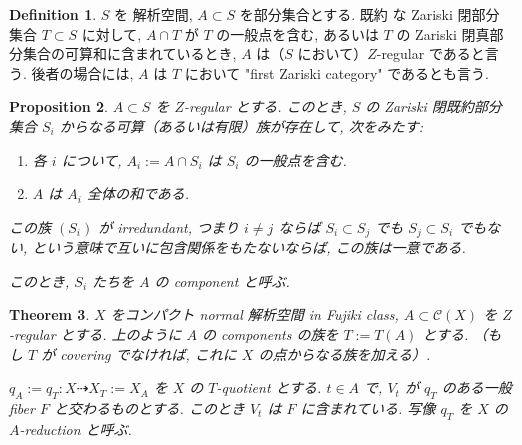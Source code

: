 \documentclass[dvipdfmx,a4paper,11pt]{article} %
\newtheorem{thm}{Theorem}[section]
\newtheorem{prop}[thm]{Proposition}
\theoremstyle{definition}
\newtheorem{defn}[thm]{Definition}
\theoremstyle{remark}
\numberwithin{equation}{section}
\begin{document}
\begin{defn}\cite[Definition 2.1]{Cam04a}
\(S\) を 解析空間,  \(A \subset S\) を部分集合とする. 
既約 な Zariski 閉部分集合 \(T \subset S\) に対して, \(A \cap T\) が \(T\) の一般点を含む, あるいは \(T\) の Zariski 閉真部分集合の可算和に含まれているとき, \(A\) は（\(S\) において）\(Z\)-regular であると言う.
後者の場合には, \(A\) は \(T\) において "first Zariski category" であるとも言う.
\end{defn}

\begin{prop}\cite[Propsition 2.4]{Cam04a}
\(A \subset S\) を \(Z\)-regular とする.
このとき, \(S\) の Zariski 閉既約部分集合 \(S_i\) からなる可算（あるいは有限）族が存在して, 次をみたす: 
\begin{enumerate}
\item 各 \(i\) について, \(A_i := A \cap S_i\) は \(S_i\) の一般点を含む.
\item \(A\) は \(A_i\) 全体の和である.
\end{enumerate}
 この族 \((S_i)\) が irredundant, つまり \(i\ne j\) ならば \(S_i\subset S_j\) でも \(S_j\subset S_i\) でもない, という意味で互いに包含関係をもたないならば, この族は一意である.

このとき, \(S_i\) たちを \(A\) の component と呼ぶ.
\end{prop}


\begin{thm}\cite[Theorem 2.5]{Cam04a}
\(X\) をコンパクト normal 解析空間 in Fujiki class, \(A \subset \mathcal{C}(X)\) を \(Z\)-regular とする. 上のように \(A\) の components の族を \(T := T(A)\) とする. （もし \(T\) が covering でなければ, これに \(X\) の点からなる族を加える）.

\(q_A := q_T : X \dashrightarrow X_T := X_A\) を \(X\) の \(T\)-quotient とする.
\(t \in A\) で, \(V_t\) が \(q_T\) のある一般 fiber \(F\) と交わるものとする.
このとき \(V_t\) は \(F\) に含まれている. 写像 \(q_T\) を \(X\) の \(A\)-reduction と呼ぶ.
\end{thm}
\end{document}
